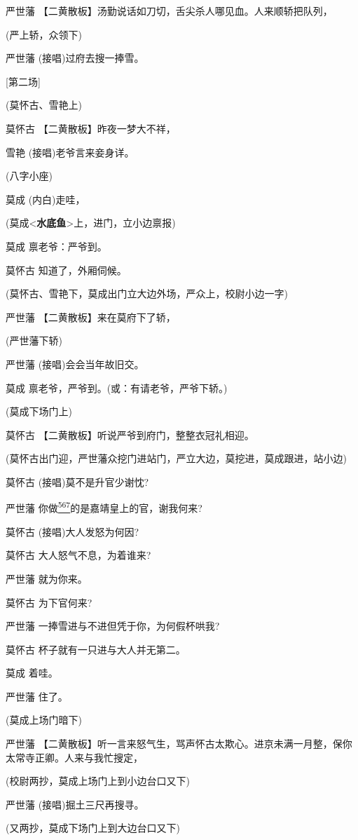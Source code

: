 严世藩 【二黄散板】汤勤说话如刀切，舌尖杀人哪见血。人来顺轿把队列，

(严上轿，众领下)

严世藩 (接唱)过府去搜一捧雪。

{[}第二场{]}

(莫怀古、雪艳上)

莫怀古 【二黄散板】昨夜一梦大不祥，

雪艳 (接唱)老爷言来妾身详。

(八字小座)

莫成 (内白)走哇，

(莫成\textless{}\textbf{水底鱼}\textgreater{}上，进门，立小边禀报)

莫成 禀老爷：严爷到。

莫怀古 知道了，外厢伺候。

(莫怀古、雪艳下，莫成出门立大边外场，严众上，校尉小边一字)

严世藩 【二黄散板】来在莫府下了轿，

(严世藩下轿)

严世藩 (接唱)会会当年故旧交。

莫成 禀老爷，严爷到。(或：有请老爷，严爷下轿。)

(莫成下场门上)

莫怀古 【二黄散板】听说严爷到府门，整整衣冠礼相迎。

(莫怀古出门迎，严世藩众挖门进站门，严立大边，莫挖进，莫成跟进，站小边)

莫怀古 (接唱)莫不是升官少谢忱?

严世藩
你做\protect\hyperlink{fn567}{\textsuperscript{567}}的是嘉靖皇上的官，谢我何来?

莫怀古 (接唱)大人发怒为何因?

莫怀古 大人怒气不息，为着谁来?

严世藩 就为你来。

莫怀古 为下官何来?

严世藩 一捧雪进与不进但凭于你，为何假杯哄我?

莫怀古 杯子就有一只进与大人并无第二。

莫成 着哇。

严世藩 住了。

(莫成上场门暗下)

严世藩
【二黄散板】听一言来怒气生，骂声怀古太欺心。进京未满一月整，保你太常寺正卿。人来与我忙搜定，

(校尉两抄，莫成上场门上到小边台口又下)

严世藩 (接唱)掘土三尺再搜寻。

(又两抄，莫成下场门上到大边台口又下)

